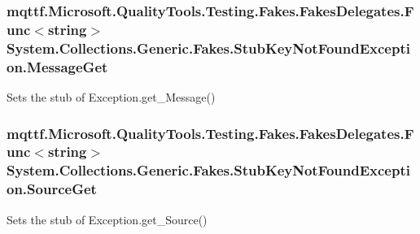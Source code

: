 \hypertarget{class_system_1_1_collections_1_1_generic_1_1_fakes_1_1_stub_key_not_found_exception_a3182a0fdfb138ef41f478d633a51d4d0}{
\subsubsection[{Message\-Get}]{\setlength{\rightskip}{0pt plus 5cm}mqttf.\-Microsoft.\-Quality\-Tools.\-Testing.\-Fakes.\-Fakes\-Delegates.\-Func$<$string$>$ System.\-Collections.\-Generic.\-Fakes.\-Stub\-Key\-Not\-Found\-Exception.\-Message\-Get}}\label{class_system_1_1_collections_1_1_generic_1_1_fakes_1_1_stub_key_not_found_exception_a3182a0fdfb138ef41f478d633a51d4d0}


Sets the stub of Exception.\-get\-\_\-\-Message()

\hypertarget{class_system_1_1_collections_1_1_generic_1_1_fakes_1_1_stub_key_not_found_exception_a572408baae08e23e968b726fbc0fc136}{
\subsubsection[{Source\-Get}]{\setlength{\rightskip}{0pt plus 5cm}mqttf.\-Microsoft.\-Quality\-Tools.\-Testing.\-Fakes.\-Fakes\-Delegates.\-Func$<$string$>$ System.\-Collections.\-Generic.\-Fakes.\-Stub\-Key\-Not\-Found\-Exception.\-Source\-Get}}\label{class_system_1_1_collections_1_1_generic_1_1_fakes_1_1_stub_key_not_found_exception_a572408baae08e23e968b726fbc0fc136}


Sets the stub of Exception.\-get\-\_\-\-Source()

